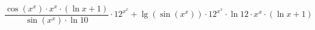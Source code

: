 \documentclass{article}
\begin{document}
       

\[{\frac{{\cos({ x }^{ x })}\cdot{{{ x }^{ x }}\cdot{(\ln x + 1 )}}}{{\sin({ x }^{ x })}\cdot{\ln 10 }}}\cdot{{ 12 }^{{ x }^{ x }}}+{\lg(\sin({ x }^{ x }))}\cdot{{{ 12 }^{{ x }^{ x }}}\cdot{{\ln 12 }\cdot{{{ x }^{ x }}\cdot{(\ln x + 1 )}}}}\]
\end{document}
